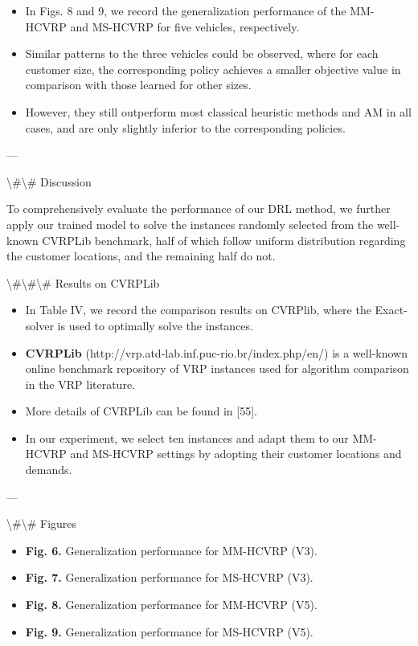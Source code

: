 \documentclass{article}
\begin{document}
	\begin{itemize}
		\item In Figs. 8 and 9, we record the generalization performance of the MM-HCVRP and MS-HCVRP for five vehicles, respectively.
		\item Similar patterns to the three vehicles could be observed, where for each customer size, the corresponding policy achieves a smaller objective value in comparison with those learned for other sizes.
		\item However, they still outperform most classical heuristic methods and AM in all cases, and are only slightly inferior to the corresponding policies.
	\end{itemize}
	
	---
	
	\textbackslash{}#\textbackslash{}# Discussion
	
	To comprehensively evaluate the performance of our DRL method, we further apply our trained model to solve the instances randomly selected from the well-known CVRPLib benchmark, half of which follow uniform distribution regarding the customer locations, and the remaining half do not.
	
	\textbackslash{}#\textbackslash{}#\textbackslash{}# Results on CVRPLib
	
	\begin{itemize}
		\item In Table IV, we record the comparison results on CVRPlib, where the Exact-solver is used to optimally solve the instances.
		\item \textbf{CVRPLib} (http://vrp.atd-lab.inf.puc-rio.br/index.php/en/) is a well-known online benchmark repository of VRP instances used for algorithm comparison in the VRP literature.
		\item More details of CVRPLib can be found in [55].
		\item In our experiment, we select ten instances and adapt them to our MM-HCVRP and MS-HCVRP settings by adopting their customer locations and demands.
	\end{itemize}
	
	---
	
	\textbackslash{}#\textbackslash{}# Figures
	
	\begin{itemize}
		\item \textbf{Fig. 6.} Generalization performance for MM-HCVRP (V3).
		\item \textbf{Fig. 7.} Generalization performance for MS-HCVRP (V3).
		\item \textbf{Fig. 8.} Generalization performance for MM-HCVRP (V5).
		\item \textbf{Fig. 9.} Generalization performance for MS-HCVRP (V5).
	\end{itemize}
	
\end{document}
